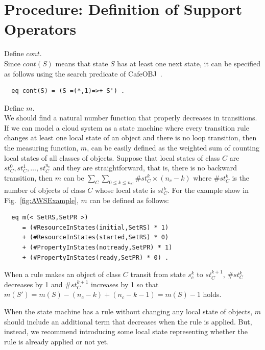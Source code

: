 \documentclass[12pt]{report}
\newcommand{\cafeobj}{{\sf CafeOBJ}~}
\begin{document}
\section{Procedure: Definition of Support Operators}
\label{sec:support}
 Define $cont$. \\ Since $cont(S)$ means that
state $S$ has at least one next state, it can be specified as follows
using the search predicate of \cafeobj.
\begin{verbatim}
  eq cont(S) = (S =(*,1)=>+ S') .
\end{verbatim}
 Define $m$. \\ We should find a natural
number function that properly decreases in transitions. If we can
model a cloud system as a state machine where every transition rule
changes at least one local state of an object and there is no loop
transition, then the measuring function, $m$, can be easily defined as
the weighted sum of counting local states of all classes of objects.
Suppose that local states of class $C$ are $st_C^0, st_C^1, \dots ,
st_C^{n_c}$ and they are straightforward, that is, there is no
backward transition, then $m$ can be $\sum_{C} \sum_{0 \le k \le n_C}
\#st_C^k \times (n_c - k)$ where $\#st_C^k$ is the number of objects
of class $C$ whose local state is $st_C^k$. For the example show in
Fig.~\ref{fig:AWSExample}, $m$ can be defined as follows:
\begin{verbatim}
  eq m(< SetRS,SetPR >)
     = (#ResourceInStates(initial,SetRS) * 1) 
     + (#ResourceInStates(started,SetRS) * 0)
     + (#PropertyInStates(notready,SetPR) * 1) 
     + (#PropertyInStates(ready,SetPR) * 0) .
\end{verbatim}
When a rule makes an object of class $C$ transit from state $s_c^k$ to
$st_C^{k+1}$, $\#st_C^k$ decreases by 1 and $\#st_C^{k+1}$ increases by 1 so that
$m(S')=m(S)-(n_c-k)+(n_c-k-1)=m(S)-1$ holds.

When the state machine has a rule without changing any local state
of objects, $m$ should include an additional term that decreases when
the rule is applied. But, instead, we recommend introducing some local
state representing whether the rule is already applied or not yet.
\end{document}
